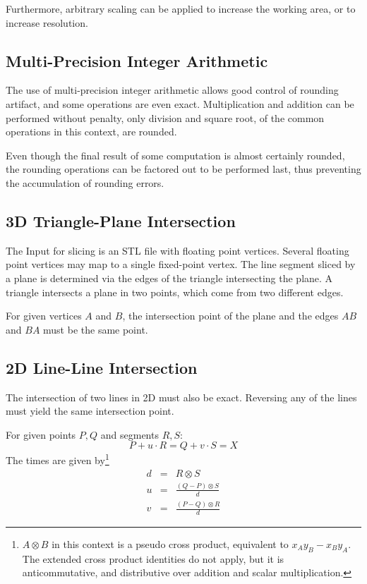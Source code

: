 \documentclass[12pt,a4paper,oneside,openany]{article}
\begin{document}
Furthermore, arbitrary scaling can be applied to increase the working area, or to increase resolution.


\subsection{Multi-Precision Integer Arithmetic}

The use of multi-precision integer arithmetic allows good control of rounding artifact, and some operations are even exact. Multiplication and addition can be performed without penalty, only division and square root, of the common operations in this context, are rounded.

Even though the final result of some computation is almost certainly rounded, the rounding operations can be factored out to be performed last, thus preventing the accumulation of rounding errors.


\subsection{3D Triangle-Plane Intersection}

The Input for slicing is an STL file with floating point vertices. Several floating point vertices may map to a single fixed-point vertex. The line segment sliced by a plane is determined via the edges of the triangle intersecting the plane. A triangle intersects a plane in two points, which come from two different edges.

For given vertices $A$ and $B$, the intersection point of the plane and the edges $AB$ and $BA$ must be the same point.

\subsection{2D Line-Line Intersection}

The intersection of two lines in 2D must also be exact. Reversing any of the lines must yield the same intersection point.

For given points $P,Q$ and segments $R,S$: $$ P + u\cdot R = Q + v \cdot S = X$$
The times are given by\footnote{$A \otimes B$ in this context is a pseudo cross product, equivalent to $x_A y_B - x_B y_A$. The extended cross product identities do not apply, but it is anticommutative, and distributive over addition and scalar multiplication. }
\begin{eqnarray*}
d &=& R \otimes S \\
u &=& \frac{(Q-P) \otimes S}{d} \\
v &=& \frac{(P-Q) \otimes R}{d}
\end{eqnarray*}
\end{document}

